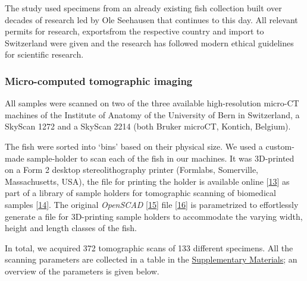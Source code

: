 The study used specimens from an already existing fish collection built over decades of research led by Ole Seehausen that continues to this day.
All relevant permits for research, exportsfrom the respective country and import to Switzerland were given and the research has followed modern ethical guidelines for scientific research.

\hypertarget{micro-computed-tomographic-imaging}{%
\subsubsection{Micro-computed tomographic imaging}\label{micro-computed-tomographic-imaging}}

All samples were scanned on two of the three available high-resolution micro-CT machines of the Institute of Anatomy of the University of Bern in Switzerland, a SkyScan 1272 and a SkyScan 2214 (both Bruker microCT, Kontich, Belgium).

The fish were sorted into `bins' based on their physical size.
We used a custom-made sample-holder to scan each of the fish in our machines.
It was 3D-printed on a Form 2 desktop stereolithography printer (Formlabs, Somerville, Massachusetts, USA), the file for printing the holder is available online {[}\protect\hyperlink{ref-VCZPOv2f}{13}{]} as part of a library of sample holders for tomographic scanning of biomedical samples {[}\protect\hyperlink{ref-115PPSuQp}{14}{]}.
The original \emph{OpenSCAD} {[}\protect\hyperlink{ref-wsjdcTeC}{15}{]} file {[}\protect\hyperlink{ref-f7OzrzUv}{16}{]} is parametrized to effortlessly generate a file for 3D-printing sample holders to accommodate the varying width, height and length classes of the fish.

In total, we acquired 372 tomographic scans of 133 different specimens.
All the scanning parameters are collected in a table in the \protect\hyperlink{supplementary-materials}{Supplementary Materials}; an overview of the parameters is given below.

